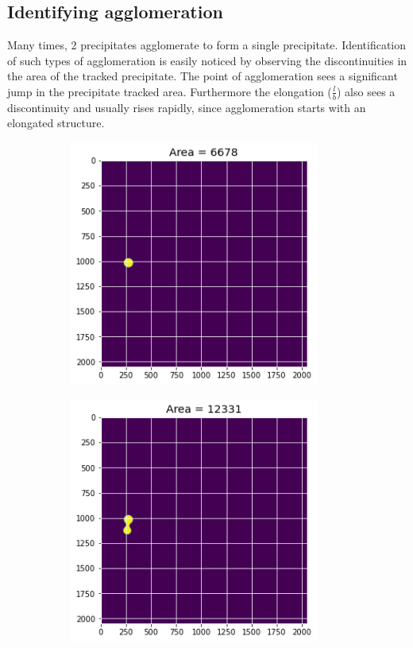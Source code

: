 \documentclass[12pt, a4paper]{report}
\begin{document}
\subsection{Identifying agglomeration}
Many times, 2 precipitates agglomerate to form a single precipitate. Identification of such types of agglomeration is easily noticed by observing the discontinuities in the area of the tracked precipitate. The point of agglomeration sees a significant jump in the precipitate tracked area. Furthermore the elongation ($\frac{l}{b}$) also sees a discontinuity and usually rises rapidly, since agglomeration starts with an elongated structure.
\begin{figure}[H]
\centering
\begin{subfigure}{.24\textwidth}
  \centering
  \includegraphics[width=0.9\textwidth]{Pictures/Growth/2.1.jpeg}
  \label{img:microstrImg}
\end{subfigure}
\begin{subfigure}{.24\textwidth}
  \centering
  \includegraphics[width=0.9\textwidth]{Pictures/Growth/2.2.jpeg}

\end{subfigure}
\end{figure}
\end{document}
